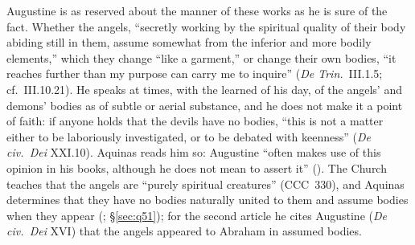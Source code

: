 Augustine is as reserved about the manner of these works as he is sure of
the fact. Whether the angels, ``secretly working by the spiritual quality
of their body abiding still in them, assume somewhat from the inferior
and more bodily elements,'' which they change ``like a garment,'' or
change their own bodies, ``it reaches further than my purpose can carry
me to inquire'' (\emph{De Trin.}\ III.1.5; cf.\ III.10.21). He speaks at
times, with the learned of his day, of the angels' and demons' bodies as
of subtle or aerial substance, and he does not make it a point of faith:
if anyone holds that the devils have no bodies, ``this is not a matter
either to be laboriously investigated, or to be debated with keenness''
(\emph{De civ.\ Dei} XXI.10). Aquinas reads him so: Augustine ``often
makes use of this opinion in his books, although he does not mean to
assert it'' (). The Church teaches that the angels are
``purely spiritual creatures'' (CCC~330), and Aquinas determines that they
have no bodies naturally united to them and assume bodies when they appear
(; \S\ref{sec:q51}); for the second article he
cites Augustine (\emph{De civ.\ Dei} XVI) that the angels appeared to
Abraham in assumed bodies.


